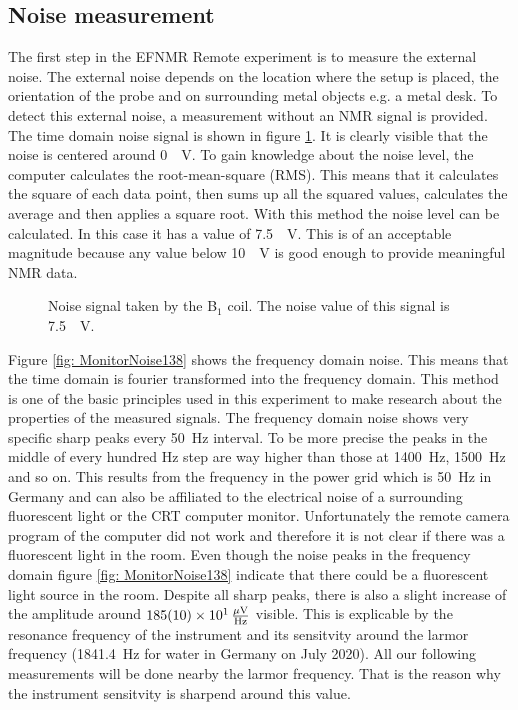 \subsection{Noise measurement}
\label{sec:Noisemeasurement}
The first step in the EFNMR Remote experiment is to measure the external noise.
The external noise depends on the location where the setup is placed, the orientation of the probe and on surrounding metal objects e.g. a metal desk.
To detect this external noise, a measurement without an NMR signal is provided.
The time domain noise signal is shown in figure \ref{fig: noise}.
It is clearly visible that the noise is centered around \SI{0}{\mu \volt}.
To gain knowledge about the noise level, the computer calculates the root-mean-square (RMS).
This means that it calculates the square of each data point, then sums up all the squared values, calculates the average and then applies a square root.
With this method the noise level can be calculated.
In this case it has a value of \SI{7.5}{\mu \volt}.
This is of an acceptable magnitude because any value below \SI{10}{\mu \volt} is good enough to provide meaningful NMR data.

\begin{figure}[H]
    \centering
    
    \caption[Noise signal taken by the B$_1$ coil.]{Noise signal taken by the B$_1$ coil.
    The noise value of this signal is \SI{7.5}{\mu \volt}.}
    \label{fig: noise}
\end{figure}

Figure \ref{fig: MonitorNoise138} shows the frequency domain noise.
This means that the time domain is fourier transformed into the frequency domain.
This method is one of the basic principles used in this experiment to make research about the properties of the measured signals.
The frequency domain noise shows very specific sharp peaks every \SI{50}{\hertz} interval.
To be more precise the peaks in the middle of every hundred \si{\hertz} step are way higher than those at \SI{1400}{\hertz}, \SI{1500}{\hertz} and so on.
This results from the frequency in the power grid which is \SI{50}{\hertz} in Germany and can also be affiliated to the electrical noise of a surrounding fluorescent light or the CRT computer monitor.
Unfortunately the remote camera program of the computer did not work and therefore it is not clear if there was a fluorescent light in the room.
Even though the noise peaks in the frequency domain figure \ref{fig: MonitorNoise138} indicate that there could be a fluorescent light source in the room.
Despite all sharp peaks, there is also a slight increase of the amplitude around $\SI{185 \pm 10 e1}{\frac{\mu \volt}{\hertz}}$ visible.
This is explicable by the resonance frequency of the instrument and its sensitvity around the larmor frequency (\SI{1841.4}{\hertz} for water in Germany on July 2020).
All our following measurements will be done nearby the larmor frequency.
That is the reason why the instrument sensitvity is sharpend around this value.

